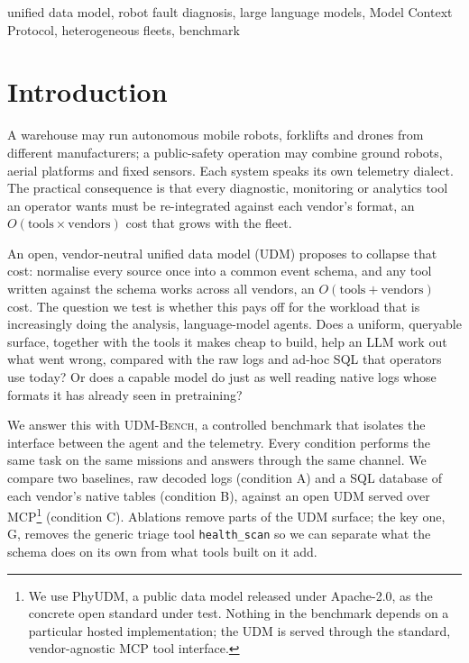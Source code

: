 \documentclass[conference]{IEEEtran}
\newcommand{\udm}{PhyUDM}
\newcommand{\condA}{A}
\newcommand{\condB}{B}
\newcommand{\condC}{C}
\newcommand{\condG}{G}
\newcommand{\hs}{\texttt{health\_scan}}
\begin{document}
\begin{IEEEkeywords}
unified data model, robot fault diagnosis, large language models, Model Context
Protocol, heterogeneous fleets, benchmark
\end{IEEEkeywords}

\section{Introduction}

A warehouse may run autonomous mobile robots, forklifts and drones from different
manufacturers; a public-safety operation may combine ground robots, aerial platforms
and fixed sensors. Each system speaks its own telemetry dialect. The practical
consequence is that every diagnostic, monitoring or analytics tool an operator wants
must be re-integrated against each vendor's format, an $O(\text{tools} \times
\text{vendors})$ cost that grows with the fleet.

An open, vendor-neutral unified data model (UDM) proposes to collapse that cost:
normalise every source once into a common event schema, and any tool written
against the schema works across all vendors, an $O(\text{tools} + \text{vendors})$
cost. The question we test is whether this pays off for the workload that is
increasingly doing the analysis, language-model agents. Does a uniform, queryable
surface, together with the tools it makes cheap to build, help an LLM work out what
went wrong, compared with the raw logs and ad-hoc SQL that operators use today? Or
does a capable model do just as well reading native logs whose formats it has
already seen in pretraining?

We answer this with \textsc{UDM-Bench}, a controlled benchmark that isolates the
interface between the agent and the telemetry. Every condition performs the same
task on the same missions and answers through the same channel. We compare two
baselines, raw decoded logs (condition \condA) and a SQL database of each vendor's
native tables (condition \condB), against an open UDM served over
MCP\footnote{We use \udm{}, a public data model released under Apache-2.0, as the
concrete open standard under test. Nothing in the benchmark depends on a particular
hosted implementation; the UDM is served through the standard, vendor-agnostic MCP
tool interface.} (condition \condC). Ablations remove parts of the UDM surface; the
key one, \condG{}, removes the generic triage tool \hs{} so we can separate what the
schema does on its own from what tools built on it add.
\end{document}
